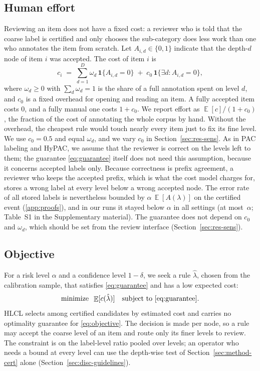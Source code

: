 \documentclass[preprint,12pt]{elsarticle}
\theoremstyle{definition}
\newcommand{\hlcl}{\textup{\textsc{HLCL}}}
\DeclareMathOperator{\E}{\mathbb{E}}
\begin{document}
\subsection{Human effort}
\label{sec:setting-effort}


Reviewing an item does not have a fixed cost: a reviewer who is told that the
coarse label is certified and only chooses the sub-category does less work than
one who annotates the item from scratch. Let $A_{i,d}\in\{0,1\}$ indicate
that the depth-$d$ node of item $i$ was accepted. The cost of item $i$ is
\begin{equation}
  c_i \;=\; \sum_{d=1}^{D} \omega_d\,\mathbf{1}\{A_{i,d}=0\}
  \;+\; c_0\,\mathbf{1}\{\exists d: A_{i,d}=0\},
  \label{eq:effort}
\end{equation}
where $\omega_d\ge0$ with $\sum_d \omega_d=1$ is the share of a full annotation
spent on level $d$, and $c_0$ is a fixed overhead for opening and reading an
item. A fully accepted item costs $0$, and a fully manual one costs $1+c_0$. We
report effort as $\E[c]/(1+c_0)$, the fraction of the cost of annotating the
whole corpus by hand. Without the overhead, the cheapest rule would touch nearly
every item just to fix its fine level. We use $c_0=0.5$ and equal
$\omega_d$, and we vary $c_0$ in Section~\ref{sec:res-sens}. As in PAC labeling \citep{candes2026pac} and HyPAC, we assume that the
reviewer is correct on the levels left to them; the guarantee
\eqref{eq:guarantee} itself does not need this assumption, because it concerns
accepted labels only. Because correctness is prefix agreement, a reviewer who
keeps the accepted prefix, which is what the cost model charges for, stores a
wrong label at every level below a wrong accepted node. The error rate of all
stored labels is nevertheless bounded by $\alpha\,\E[A(\lambda)]$ on the
certified event (\ref{app:proofs}), and in our runs it stayed below $\alpha$ in
all settings (at most $\,\alpha$; Table~S1 in the
Supplementary material).
The guarantee does not depend on $c_0$ and $\omega_d$, which should be set from
the review interface (Section~\ref{sec:res-sens}).

\subsection{Objective}

For a risk level $\alpha$ and a confidence level $1-\delta$, we seek a rule
$\hat\lambda$, chosen from the calibration sample, that satisfies
\eqref{eq:guarantee} and has a low expected cost:
\begin{equation}
  \text{minimize}\;\; \E[c(\hat\lambda)]
  \quad\text{subject to \eqref{eq:guarantee}.}
  \label{eq:objective}
\end{equation}
\hlcl{} selects among certified candidates by estimated cost and carries no
optimality guarantee for \eqref{eq:objective}.
The decision is made per node, so a rule may accept the coarse level of an item
and route only its finer levels to review. The constraint is on the label-level
ratio pooled over levels; an operator who needs a bound at every level can use
the depth-wise test of Section~\ref{sec:method-cert} alone
(Section~\ref{sec:disc-guidelines}).
\end{document}
